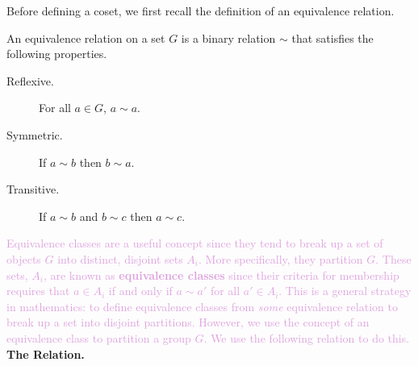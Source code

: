     Before defining a coset, we first recall the definition of an
    equivalence relation. 

    \begin{definition}
        An equivalence relation on a set $G$ is a binary relation
        $\sim$ that satisfies the following properties.
        \begin{description}
            \item[Reflexive.] For all $a \in G$, $a \sim a$.
            \item[Symmetric.] If $a \sim b$ then $b \sim a$.
            \item[Transitive.] If $a \sim b$ and $b \sim c$ then $a
            \sim c$. 
        \end{description}
    \end{definition}

    \textcolor{Plum}{Equivalence classes are a useful concept since they tend to break
    up a set of objects $G$ into distinct, disjoint sets $A_i$. More
    specifically, they partition $G$. These sets, $A_i$, are
    known as \textbf{equivalence classes} since their criteria for
    membership requires that $a \in A_i$ if and only if $a \sim a'$ for
    all $a' \in A_i$. 
    This is a general strategy in mathematics: to define equivalence
    classes from \textit{some} equivalence relation to break up a set
    into disjoint partitions. However, we use the
    concept of an equivalence class to partition a group $G$. We use
    the following relation to do this.}
    \\

    \textcolor{blue!90!black!100}{\textbf{The Relation.}}

